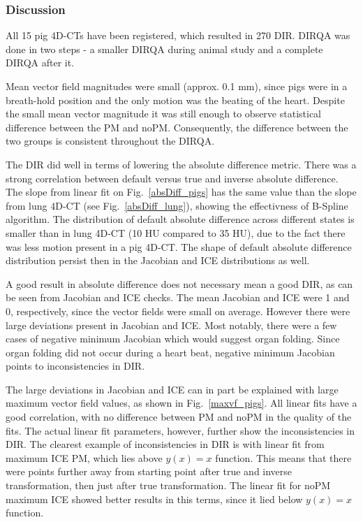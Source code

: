 \subsubsection{Discussion}

All 15 pig 4D-CTs have been registered, which resulted in 270 DIR. DIRQA was done in two steps - a smaller DIRQA during animal study and a complete DIRQA after it.

Mean vector field magnitudes were small (approx. 0.1 mm), since pigs were in a breath-hold position and the only motion was the beating of the heart. 
Despite the small mean vector magnitude it was still enough to observe statistical difference between the PM and noPM.
Consequently, the difference between the two groups is consistent throughout the DIRQA.

The DIR did well in terms of lowering the absolute difference metric. There was a strong correlation between default versus true and inverse absolute difference. 
The slope from linear fit on Fig.~\ref{absDiff_pigs} has the same value than the slope from lung 4D-CT (see Fig.~\ref{absDiff_lung}), showing
the effectivness of B-Spline algorithm. The distribution of default absolute difference across different states is smaller than in lung 4D-CT (10 HU compared to 35 HU), due to the fact
there was less motion present in a pig 4D-CT. The shape of default absolute difference
distribution persist then in the Jacobian and ICE distributions as well. 

A good result in absolute difference does not necessary mean a good DIR, as can be seen from Jacobian and ICE checks. The mean Jacobian and ICE were 1 and 0, respectively, since the
vector fields were small on average. However there were large deviations present in Jacobian and ICE. Most notably, there were a few cases of negative minimum Jacobian which would suggest 
organ folding. Since organ folding did not occur during a heart beat, negative minimum Jacobian points to inconsistencies in DIR. 

The large deviations in Jacobian and ICE can in part be explained with large maximum vector field values, as shown in Fig.~\ref{maxvf_pigs}. All linear fits have a good correlation, with no
difference between PM and noPM in the quality of the fits. The actual linear fit parameters, however, further show the inconsistencies in DIR. The clearest example of inconsistencies in
DIR is with linear fit from maximum ICE PM, which lies above $y(x)=x$ function. This means that there were points further away from starting point after true and inverse transformation, 
then just after true transformation. The linear fit for noPM maximum ICE showed better results in this terms, since it lied below $y(x)=x$ function.


